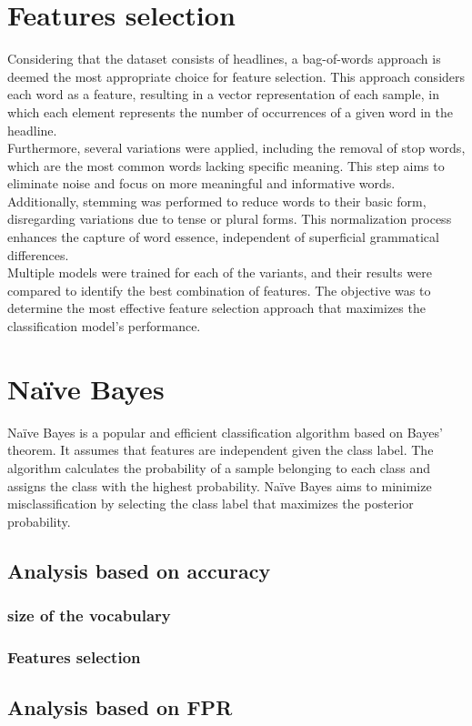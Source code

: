 \documentclass{class}
\begin{document}
\section{Features selection}
Considering that the dataset consists of headlines, a bag-of-words approach is deemed the most appropriate choice for feature selection.
This approach considers each word as a feature, resulting in a vector representation of each sample,
in which each element represents the number of occurrences of a given word in the headline.\\
Furthermore, several variations were applied, including the removal of stop words, which are the most common words lacking specific meaning.
This step aims to eliminate noise and focus on more meaningful and informative words.\\
Additionally, stemming was performed to reduce words to their basic form, disregarding variations due to tense or plural forms.
This normalization process enhances the capture of word essence, independent of superficial grammatical differences.\\
Multiple models were trained for each of the variants, and their results were compared to identify the best combination of features.
The objective was to determine the most effective feature selection approach that maximizes the classification model's performance.
\section{Na\"ive Bayes}
Na\"ive Bayes is a popular and efficient classification algorithm based on Bayes' theorem.
It assumes that features are independent given the class label. The algorithm calculates the probability of a
sample belonging to each class and assigns the class with the highest probability.
Na\"ive Bayes aims to minimize misclassification by selecting the class label that maximizes the posterior probability.
\subsection{Analysis based on accuracy}
\subsubsection*{size of the vocabulary}
\subsubsection*{Features selection}
\subsection{Analysis based on FPR}
\end{document}
